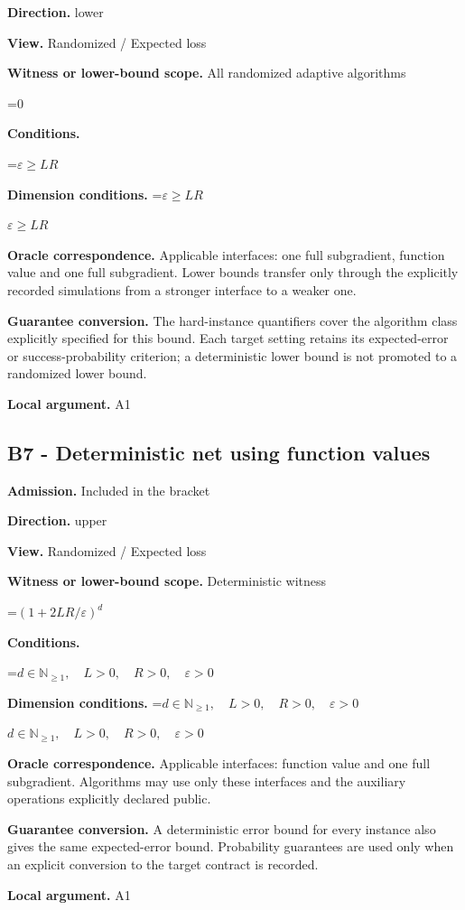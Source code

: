 \documentclass[10pt,a4paper]{article}
\newcommand{\AtlasMath}[1]{\par\begingroup\centering\setbox0=\hbox{$\displaystyle #1$}\ifdim\wd0>1.4\linewidth\typeout{ATLAS WIDE FORMULA: \the\wd0}\fi\ifdim\wd0>\linewidth\resizebox{\linewidth}{!}{\box0}\else\box0\fi\par\endgroup}
\newcommand{\AtlasInlineMath}[1]{\begingroup\setbox0=\hbox{$#1$}\ifdim\wd0>.4\linewidth\endgroup\AtlasMath{#1}\else\endgroup$#1$\fi}
\begin{document}
\textbf{Direction.} lower

\textbf{View.} Randomized / Expected loss

\textbf{Witness or lower-bound scope.} All randomized adaptive algorithms

\AtlasMath{0}
\textbf{Conditions.} 
\AtlasMath{\varepsilon\ge LR}


\textbf{Dimension conditions.} \AtlasInlineMath{\varepsilon\ge LR}

\textbf{Oracle correspondence.} Applicable interfaces: one full subgradient, function value and one full subgradient. Lower bounds transfer only through the explicitly recorded simulations from a stronger interface to a weaker one.

\textbf{Guarantee conversion.} The hard-instance quantifiers cover the algorithm class explicitly specified for this bound. Each target setting retains its expected-error or success-probability criterion; a deterministic lower bound is not promoted to a randomized lower bound.

\textbf{Local argument.} A1

\subsection{B7 - Deterministic net using function values}
\textbf{Admission.} Included in the bracket

\textbf{Direction.} upper

\textbf{View.} Randomized / Expected loss

\textbf{Witness or lower-bound scope.} Deterministic witness

\AtlasMath{(1+2LR/\varepsilon)^d}
\textbf{Conditions.} 
\AtlasMath{d\in\mathbb{N}_{\ge1},\quad L>0,\quad R>0,\quad \varepsilon>0}


\textbf{Dimension conditions.} \AtlasInlineMath{d\in\mathbb{N}_{\ge1},\quad L>0,\quad R>0,\quad \varepsilon>0}

\textbf{Oracle correspondence.} Applicable interfaces: function value and one full subgradient. Algorithms may use only these interfaces and the auxiliary operations explicitly declared public.

\textbf{Guarantee conversion.} A deterministic error bound for every instance also gives the same expected-error bound. Probability guarantees are used only when an explicit conversion to the target contract is recorded.

\textbf{Local argument.} A1
\end{document}
